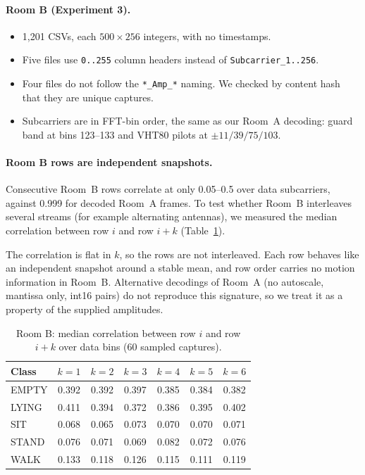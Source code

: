 \documentclass[11pt,a4paper]{article}
\begin{document}
\paragraph{Room B (Experiment 3).}
\begin{itemize}
  \item 1{,}201 CSVs, each $500\times256$ integers, with no timestamps.
  \item Five files use \texttt{0..255} column headers instead of \texttt{Subcarrier\_1..256}.
  \item Four files do not follow the \texttt{*\_Amp\_*} naming. We checked by content hash that they are unique captures.
  \item Subcarriers are in FFT-bin order, the same as our Room~A decoding: guard band at bins 123--133 and VHT80 pilots at $\pm11/39/75/103$.
\end{itemize}

\paragraph{Room B rows are independent snapshots.}
Consecutive Room~B rows correlate at only 0.05--0.5 over data subcarriers, against 0.999 for decoded Room~A frames. To test whether Room~B interleaves several streams (for example alternating antennas), we measured the median correlation between row $i$ and row $i{+}k$ (Table~\ref{tab:lag}).

The correlation is flat in $k$, so the rows are not interleaved. Each row behaves like an independent snapshot around a stable mean, and row order carries no motion information in Room~B. Alternative decodings of Room~A (no autoscale, mantissa only, int16 pairs) do not reproduce this signature, so we treat it as a property of the supplied amplitudes.

\begin{table}[H]
\centering\small
\caption{Room B: median correlation between row $i$ and row $i+k$ over data bins (60 sampled captures).}
\label{tab:lag}
\begin{tabular}{lcccccc}
\toprule
Class & $k{=}1$ & $k{=}2$ & $k{=}3$ & $k{=}4$ & $k{=}5$ & $k{=}6$\\
\midrule
EMPTY & 0.392 & 0.392 & 0.397 & 0.385 & 0.384 & 0.382\\
LYING & 0.411 & 0.394 & 0.372 & 0.386 & 0.395 & 0.402\\
SIT & 0.068 & 0.065 & 0.073 & 0.070 & 0.070 & 0.071\\
STAND & 0.076 & 0.071 & 0.069 & 0.082 & 0.072 & 0.076\\
WALK & 0.133 & 0.118 & 0.126 & 0.115 & 0.111 & 0.119\\
\bottomrule
\end{tabular}
\end{table}
\end{document}
